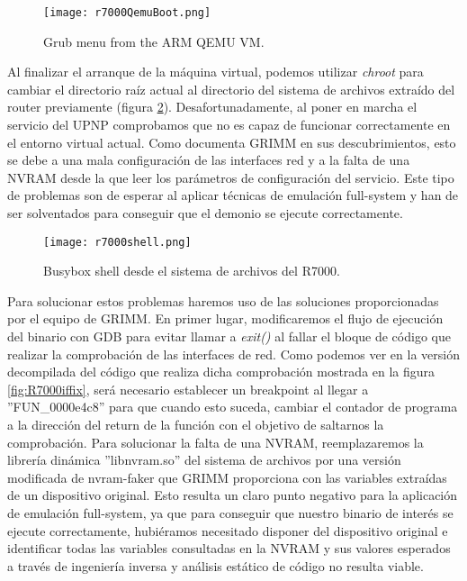 \begin{figure}[H]
    \centering
    \texttt{[image: r7000QemuBoot.png]}
    \caption{Grub menu from the ARM QEMU VM.}
    \label{fig:R7000QemuBoot}
\end{figure}

Al finalizar el arranque de la máquina virtual, podemos utilizar \textit{chroot} para cambiar el directorio raíz actual al directorio 
del sistema de archivos extraído del router previamente (figura \ref{fig:R7000shell}). Desafortunadamente, al poner en marcha el 
servicio del UPNP comprobamos que no es capaz de funcionar correctamente en el entorno virtual actual. Como documenta GRIMM\cite{r7000GRIMM}
en sus descubrimientos, esto se debe a una mala configuración de las interfaces red y a la falta de una NVRAM desde la que leer los 
parámetros de configuración del servicio. Este tipo de problemas son de esperar al aplicar técnicas de emulación full-system y han 
de ser solventados para conseguir que el demonio se ejecute correctamente.

\begin{figure}[H]
    \centering
    \texttt{[image: r7000shell.png]}
    \caption{Busybox shell desde el sistema de archivos del R7000.}
    \label{fig:R7000shell}
\end{figure}

Para solucionar estos problemas haremos uso de las soluciones proporcionadas por el equipo de GRIMM\cite{r7000GRIMM}. En primer
lugar, modificaremos el flujo de ejecución del binario con GDB para evitar llamar a \textit{exit()} al fallar el bloque de código 
que realizar la comprobación de las interfaces de red. Como podemos ver en la versión decompilada del código que realiza dicha 
comprobación mostrada en la figura \ref{fig:R7000iffix}, será necesario establecer un breakpoint al llegar a ''FUN\_0000e4c8''
para que cuando esto suceda, cambiar el contador de programa a la dirección del return de la función con el objetivo de saltarnos 
la comprobación. Para solucionar la falta de una NVRAM, reemplazaremos la librería dinámica ''libnvram.so'' del sistema de archivos 
por una versión modificada de nvram-faker\cite{nvram} que GRIMM proporciona con las variables extraídas de un dispositivo original.
Esto resulta un claro punto negativo para la aplicación de emulación full-system, ya que para conseguir que nuestro binario de 
interés se ejecute correctamente, hubiéramos necesitado disponer del dispositivo original e identificar todas las variables 
consultadas en la NVRAM y sus valores esperados a través de ingeniería inversa y análisis estático de código no resulta viable. 

